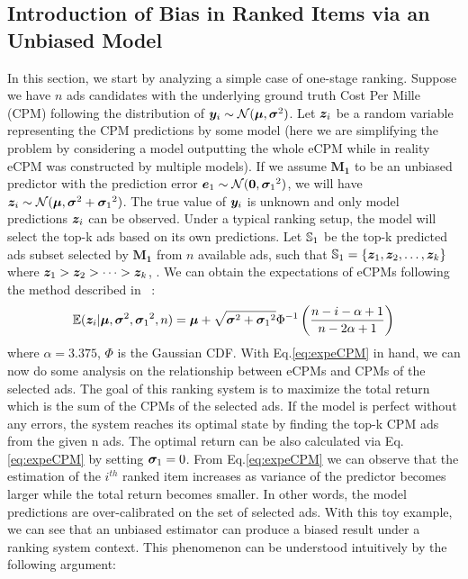 \subsection{Introduction of Bias in Ranked Items via an Unbiased Model}
\label{subsec:introduced_bias}


In this section, we start by analyzing a simple case of one-stage ranking.
Suppose we have $n$ ads candidates with the underlying ground truth Cost Per Mille (CPM) following the distribution of ${\bm{y}}_i\sim{\mathcal{N}}({\bm{\mu}}, {\bm{\sigma}}^2)$. Let ${\bm{z}}_i$ be a random variable representing the CPM predictions by some model (here we are simplifying the problem by considering a model outputting the whole eCPM while in reality eCPM was constructed by multiple models). If we assume $\mathbf{M_1}$ to be an unbiased predictor with the prediction error ${\bm{e}}_1\sim{\mathcal{N}}({\bm{0}}, {{\bm{\sigma}}_1}^2)$, we will have ${\bm{z}}_i\sim{\mathcal{N}}({\bm{\mu}}, {\bm{\sigma}}^2+{{\bm{\sigma}}_1}^2)$. The true value of ${\bm{y}}_i$ is unknown and only model predictions ${\bm{z}}_i$ can be observed. Under a typical ranking setup, the model will select the top-k ads based on its own predictions. Let ${\mathbb{S}}_1$ be the top-k predicted ads subset selected by $\mathbf{M_1}$ from $n$ available ads, such that  ${\mathbb{S}}_1=\{{\bm{z}}_1, {\bm{z}}_2, \dots, {\bm{z}}_k\}$ where ${\bm{z}}_1>{\bm{z}}_2>\dots> {\bm{z}}_k$, . 
We can obtain the expectations of eCPMs following the method described in ~\cite{royston1982expected}:
\begin{align}
    \label{eq:expeCPM}
    \mathbb{E}({\bm{z}}_i| {\bm{\mu}}, {\bm{\sigma}}^2,{{\bm{\sigma}}_1}^2,n)={\bm{\mu}}+
    \sqrt{{\bm{\sigma}}^2+{{\bm{\sigma}}_1}^2}\Phi^{-1}\left(\frac{n-i-\alpha+1}{n-2\alpha+1}  \right)
\end{align}
where $\alpha=3.375$, $\Phi$ is the Gaussian CDF.
With Eq.\ref{eq:expeCPM} in hand, we can now do some analysis on the relationship between eCPMs and CPMs of the selected ads. The goal of this ranking system is to maximize the total return which is the sum of the CPMs of the selected ads. If the model is perfect without any errors, the system reaches its optimal state by finding the top-k CPM ads from the given n ads. The optimal return can be also calculated via Eq.\ref{eq:expeCPM} by setting ${\bm{\sigma}}_1=0$. From Eq.\ref{eq:expeCPM} we can observe that the estimation of the $i^{th}$ ranked item increases as variance of the predictor becomes larger while the total return becomes smaller. In other words, the model predictions are over-calibrated on the set of selected ads. With this toy example, we can see that an unbiased estimator can produce a biased result under a ranking system context. This phenomenon can be understood intuitively by the following argument:
